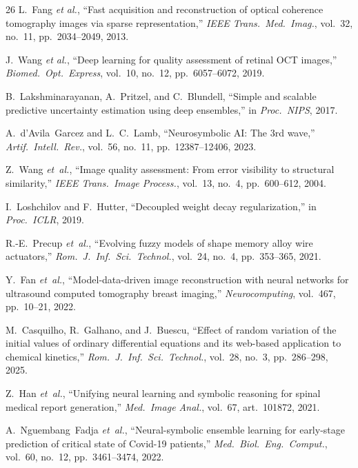 \begin{thebibliography}{26}
L.~Fang \emph{et al.}, ``Fast acquisition and reconstruction of optical coherence tomography images via sparse representation,'' \emph{IEEE Trans.\ Med.\ Imag.}, vol.~32, no.~11, pp.~2034--2049, 2013.

J.~Wang \emph{et al.}, ``Deep learning for quality assessment of retinal OCT images,'' \emph{Biomed.\ Opt.\ Express}, vol.~10, no.~12, pp.~6057--6072, 2019.

B.~Lakshminarayanan, A.~Pritzel, and C.~Blundell, ``Simple and scalable predictive uncertainty estimation using deep ensembles,'' in \emph{Proc.\ NIPS}, 2017.

A.~d'Avila~Garcez and L.~C.~Lamb, ``Neurosymbolic AI: The 3rd wave,'' \emph{Artif.\ Intell.\ Rev.}, vol.~56, no.~11, pp.~12387--12406, 2023.

Z.~Wang \emph{et~al.}, ``Image quality assessment: From error visibility to structural similarity,'' \emph{IEEE Trans.\ Image Process.}, vol.~13, no.~4, pp.~600--612, 2004.

I.~Loshchilov and F.~Hutter, ``Decoupled weight decay regularization,'' in \emph{Proc.\ ICLR}, 2019.

R.-E.~Precup \emph{et~al.}, ``Evolving fuzzy models of shape memory alloy wire actuators,'' \emph{Rom.\ J.\ Inf.\ Sci.\ Technol.}, vol.~24, no.~4, pp.~353--365, 2021.

Y.~Fan \emph{et~al.}, ``Model-data-driven image reconstruction with neural networks for ultrasound computed tomography breast imaging,'' \emph{Neurocomputing}, vol.~467, pp.~10--21, 2022.

M.~Casquilho, R.~Galhano, and J.~Buescu, ``Effect of random variation of the initial values of ordinary differential equations and its web-based application to chemical kinetics,'' \emph{Rom.\ J.\ Inf.\ Sci.\ Technol.}, vol.~28, no.~3, pp.~286--298, 2025.

Z.~Han \emph{et~al.}, ``Unifying neural learning and symbolic reasoning for spinal medical report generation,'' \emph{Med.\ Image Anal.}, vol.~67, art.~101872, 2021.

A.~Nguembang~Fadja \emph{et~al.}, ``Neural-symbolic ensemble learning for early-stage prediction of critical state of Covid-19 patients,'' \emph{Med.\ Biol.\ Eng.\ Comput.}, vol.~60, no.~12, pp.~3461--3474, 2022.


\end{thebibliography}
